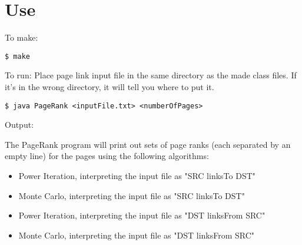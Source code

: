 \documentclass[11pt]{article}
\begin{document}
\newpage
\section*{Use}
To make: 

	\verb!$ make!
\newline

To run:
	Place page link input file in the same directory as the made class files. 
	If it's in the wrong directory, it will tell you where to put it.
	
	\verb!$ java PageRank <inputFile.txt> <numberOfPages>!
	\newline
	
Output:
	
	The PageRank program will print out sets of page ranks (each separated by an empty line) for the pages using the
	following algorithms:
	\begin{itemize}
	\item  Power Iteration, interpreting the input file as "SRC linksTo DST"
	\item Monte Carlo, interpreting the input file as "SRC linksTo DST"
	\item Power Iteration, interpreting the input file as "DST linksFrom SRC"
	\item Monte Carlo, interpreting the input file as "DST linksFrom SRC"
	\end{itemize}
\end{document}
